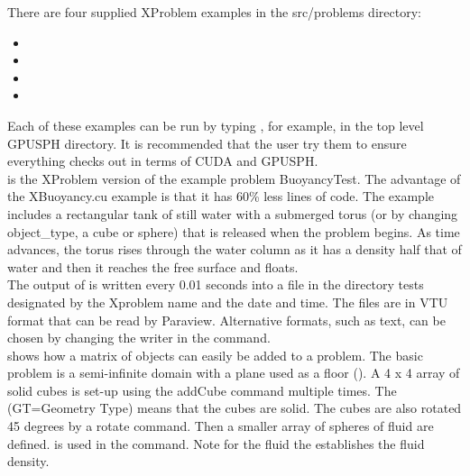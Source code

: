 \documentclass{../GPUSPHtemplate}
\begin{document}
There are four supplied XProblem examples in the src/problems directory:\\
\begin{itemize}
\item	{}
\item	{}
\item	{}
\item	{}
\end{itemize}
Each of these examples can be run by typing , 
for example,  in the top level GPUSPH directory.  
It is recommended that the user try them to ensure 
everything checks out in terms of CUDA and GPUSPH. \\

 is the XProblem version of the example problem BuoyancyTest. 
The advantage of the XBuoyancy.cu example is that it has 60\% less lines of code.
The example includes a rectangular tank of still water with a submerged torus 
(or by changing object_type, a cube or sphere) that is released when the problem begins.  
As time advances, the torus rises through the water column as it has a 
density half that of water and then it reaches the free surface and floats.  \\

The output of  is written every 0.01 seconds into a file 
in the directory tests designated by the Xproblem name and the date and time.  
The files are in VTU format that can be read by Paraview.  
Alternative formats, such as text, can be chosen by changing the writer in the  command. \\

 shows how a matrix of objects can easily be added to a problem.  
The basic problem is a semi-infinite domain with a plane used as a floor ().  
A 4 x 4 array of solid cubes is set-up using the addCube command multiple times.   
The   (GT=Geometry Type) means that the cubes are solid. 
The cubes are also rotated 45 degrees by a rotate command. 
Then a smaller array of spheres of fluid are defined.  
 is used in the  command.  
Note for the fluid the  establishes the fluid density.  \\
\end{document}

